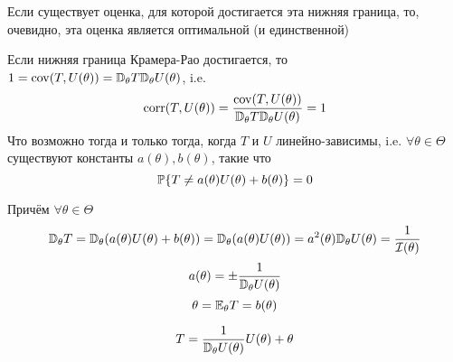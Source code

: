 Если существует оценка, для которой достигается эта нижняя граница,
то, очевидно, эта оценка является оптимальной (и единственной)

\begin{thm}
Если нижняя граница Крамера-Рао достигается,
то ${1 = \mathrm{cov}(T,U(\theta)) = \mathbb D_\theta T \mathbb D_\theta U(\theta)}$,
i.e. $$\mathrm{corr}(T,U(\theta)) = \frac{\mathrm{cov}(T,U(\theta))}{\mathbb D_\theta T \mathbb D_\theta U(\theta)} = 1$$
Что возможно тогда и только тогда, когда $T$ и $U$ линейно-зависимы,
i.e. $\forall\theta\in\Theta$ существуют константы $a(\theta), b(\theta)$, такие что
$$\mathbb P\{T \neq a(\theta) U(\theta) + b(\theta)\} = 0$$

Причём $\forall\theta\in\Theta$
$$\mathbb D_\theta T = \mathbb D_\theta(a(\theta)U(\theta) + b(\theta))
= \mathbb D_\theta(a(\theta) U(\theta)) = a^2(\theta) \mathbb D_\theta U(\theta) 
= \frac{1}{\mathcal I(\theta)}$$
$$a(\theta) = \pm\frac{1}{\mathbb D_\theta U(\theta)}$$
$$\theta=\mathbb E_\theta T = b(\theta)$$

$$T = \frac{1}{\mathbb D_\theta U(\theta)}U(\theta) + \theta$$
\end{thm}

